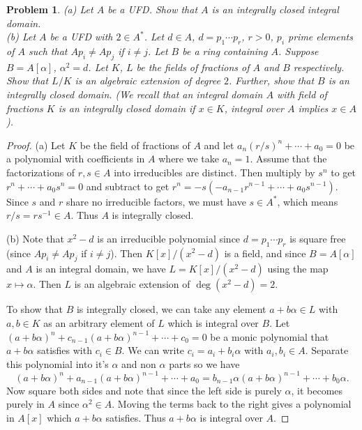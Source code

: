 \documentclass{article}
\newtheorem{problem}{Problem}
\begin{document}
\begin{problem}
(a) Let $A$ be a UFD. Show that $A$ is an integrally closed integral domain.\\
(b) Let $A$ be a UFD with $2 \in A^*$. Let $d \in A$, $d = p_1 \cdots p_r$, $r > 0$, $p_i$ prime elements of $A$ such that $Ap_i \neq Ap_j$ if $i \neq j$. Let $B$ be a ring containing $A$. Suppose $B = A[\alpha]$, $\alpha^2 = d$. Let $K$, $L$ be the fields of fractions of $A$ and $B$ respectively. Show that $L/K$ is an algebraic extension of degree $2$. Further, show that $B$ is an integrally closed domain. (We recall that an integral domain $A$ with field of fractions $K$ is an \emph{integrally closed domain} if $x \in K$, integral over $A$ implies $x \in A$).
\end{problem}
\begin{proof}
(a) Let $K$ be the field of fractions of $A$ and let $a_n(r/s)^n + \cdots + a_0 = 0$ be a polynomial with coefficients in $A$ where we take $a_n = 1$. Assume that the factorizations of $r,s \in A$ into irreducibles are distinct. Then multiply by $s^n$ to get $r^n + \cdots + a_0s^n = 0$ and subtract to get $r^n = -s(-a_{n-1}r^{n-1} + \cdots + a_0s^{n-1})$. Since $s$ and $r$ share no irreducible factors, we must have $s \in A^*$, which means $r/s = rs^{-1} \in A$. Thus $A$ is integrally closed.

(b) Note that $x^2 - d$ is an irreducible polynomial since $d = p_1 \cdots p_r$ is square free (since $Ap_i \neq Ap_j$ if $i \neq j$). Then $K[x]/(x^2 - d)$ is a field, and since $B = A[\alpha]$ and $A$ is an integral domain, we have $L = K[x]/(x^2 - d)$ using the map $x \mapsto \alpha$. Then $L$ is an algebraic extension of $\deg(x^2 - d) = 2$.

To show that $B$ is integrally closed, we can take any element $a + b\alpha \in L$ with $a,b \in K$ as an arbitrary element of $L$ which is integral over $B$. Let $(a + b\alpha)^n + c_{n-1}(a + b\alpha)^{n-1} + \cdots + c_0 = 0$ be a monic polynomial that $a + b\alpha$ satisfies with $c_i \in B$. We can write $c_i = a_i + b_i\alpha$ with $a_i, b_i \in A$. Separate this polynomial into it's $\alpha$ and non $\alpha$ parts so we have
\[
(a + b\alpha)^n + a_{n-1}(a + b\alpha)^{n-1} + \cdots + a_0 = b_{n-1}\alpha (a + b\alpha)^{n-1} + \cdots + b_0\alpha.
\]
Now square both sides and note that since the left side is purely $\alpha$, it becomes purely in $A$ since $\alpha^2 \in A$. Moving the terms back to the right gives a polynomial in $A[x]$ which $a + b\alpha$ satisfies. Thus $a + b\alpha$ is integral over $A$.


\end{proof}
\end{document}
